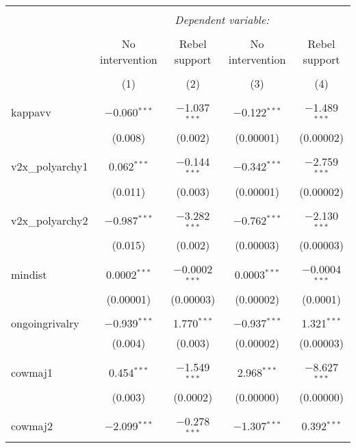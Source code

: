 
\begin{table}[!htbp] \centering 
  \caption{} 
  \label{} 
\begin{tabular}{@{\extracolsep{5pt}}lcccc} 
\\[-1.8ex]\hline 
\hline \\[-1.8ex] 
 & \multicolumn{4}{c}{\textit{Dependent variable:}} \\ 
\cline{2-5} 
\\[-1.8ex] & No intervention & Rebel support & No intervention & Rebel support \\ 
\\[-1.8ex] & (1) & (2) & (3) & (4)\\ 
\hline \\[-1.8ex] 
 kappavv & $-$0.060$^{***}$ & $-$1.037$^{***}$ & $-$0.122$^{***}$ & $-$1.489$^{***}$ \\ 
  & (0.008) & (0.002) & (0.00001) & (0.00002) \\ 
  & & & & \\ 
 v2x\_polyarchy1 & 0.062$^{***}$ & $-$0.144$^{***}$ & $-$0.342$^{***}$ & $-$2.759$^{***}$ \\ 
  & (0.011) & (0.003) & (0.00001) & (0.00002) \\ 
  & & & & \\ 
 v2x\_polyarchy2 & $-$0.987$^{***}$ & $-$3.282$^{***}$ & $-$0.762$^{***}$ & $-$2.130$^{***}$ \\ 
  & (0.015) & (0.002) & (0.00003) & (0.00003) \\ 
  & & & & \\ 
 mindist & 0.0002$^{***}$ & $-$0.0002$^{***}$ & 0.0003$^{***}$ & $-$0.0004$^{***}$ \\ 
  & (0.00001) & (0.00003) & (0.00002) & (0.0001) \\ 
  & & & & \\ 
 ongoingrivalry & $-$0.939$^{***}$ & 1.770$^{***}$ & $-$0.937$^{***}$ & 1.321$^{***}$ \\ 
  & (0.004) & (0.003) & (0.00002) & (0.00003) \\ 
  & & & & \\ 
 cowmaj1 & 0.454$^{***}$ & $-$1.549$^{***}$ & 2.968$^{***}$ & $-$8.627$^{***}$ \\ 
  & (0.003) & (0.0002) & (0.00000) & (0.00000) \\ 
  & & & & \\ 
 cowmaj2 & $-$2.099$^{***}$ & $-$0.278$^{***}$ & $-$1.307$^{***}$ & 0.392$^{***}$ \\ 

\end{tabular}
\end{table}
